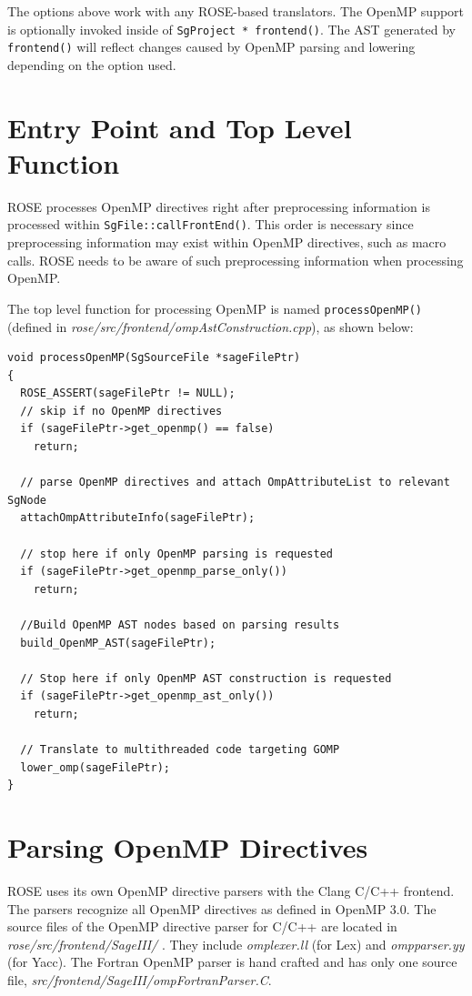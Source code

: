 The options above work with any ROSE-based translators. The OpenMP support
is optionally invoked inside of \lstinline{SgProject * frontend()}. The AST
generated by \lstinline{frontend()} will reflect changes caused by OpenMP parsing and lowering depending
on the option used.
\section{Entry Point and Top Level Function}
ROSE processes OpenMP directives right after preprocessing information is processed within \lstinline{SgFile::callFrontEnd()}.
This order is necessary since preprocessing information may exist within
OpenMP directives, such as macro calls.
ROSE needs to be aware of such preprocessing information when processing OpenMP.

The top level function for processing OpenMP is named
\lstinline{processOpenMP()} (defined in
\textit{rose/src/frontend/ompAstConstruction.cpp}), as shown below:
\lstset{language=C,basicstyle=\scriptsize,numbers=left}
\begin{lstlisting}
void processOpenMP(SgSourceFile *sageFilePtr)
{
  ROSE_ASSERT(sageFilePtr != NULL);
  // skip if no OpenMP directives
  if (sageFilePtr->get_openmp() == false)
    return;

  // parse OpenMP directives and attach OmpAttributeList to relevant SgNode
  attachOmpAttributeInfo(sageFilePtr);

  // stop here if only OpenMP parsing is requested
  if (sageFilePtr->get_openmp_parse_only())
    return;

  //Build OpenMP AST nodes based on parsing results
  build_OpenMP_AST(sageFilePtr);

  // Stop here if only OpenMP AST construction is requested
  if (sageFilePtr->get_openmp_ast_only())
    return;

  // Translate to multithreaded code targeting GOMP
  lower_omp(sageFilePtr);
}
\end{lstlisting}
\lstset{language=C,basicstyle=\small}

\section{Parsing OpenMP Directives}
ROSE uses its own OpenMP directive parsers with the Clang C/C++ frontend.
The parsers recognize all OpenMP directives as defined in OpenMP 3.0.
The source files of the OpenMP directive parser for C/C++ are located in \textit{rose/src/frontend/SageIII/ }.
They include \textit{omplexer.ll} (for Lex) and \textit{ompparser.yy} (for Yacc).
The Fortran OpenMP parser is hand crafted and has only one source file, \textit{src/frontend/SageIII/ompFortranParser.C}. 

